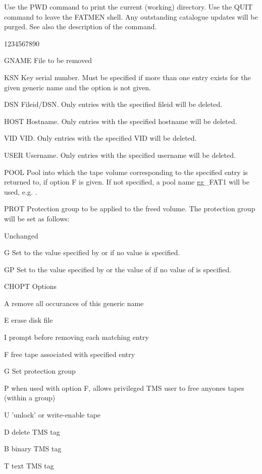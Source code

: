 Use the PWD command to print the current (working) directory.
Use the QUIT command to leave the FATMEN shell. Any outstanding
catalogue updates will be purged. See also the description
of the  command.
\begin{DLtt}{1234567890}
\item[GNAME]File to be removed
\item[KSN]Key serial number. Must be specified if more than one
entry exists for the given generic name and the 
 option is not given. 
\item[DSN]Fileid/DSN. Only entries with the specified fileid will be 
deleted.
\item[HOST]Hostname. Only entries with the specified hostname will be
deleted.
\item[VID]VID. Only entries with the specified VID will be
deleted.  
\item[USER]Username. Only entries with the specified username will be
deleted.
\item[POOL]Pool into which the tape volume corresponding to the
specified entry is returned to, if option F is given.
If not specified, a pool name gg\_FAT1 will be used, e.g. .
\item[PROT]Protection group to be applied to the freed volume.
The protection group will be set as follows:
\begin{DLtt}{12}
\item[ ]Unchanged
\item[G]Set to the value specified by  or 
if no value is specified.
\item[GP]Set to the value specified by  or the value
of  if no value of  is specified.
\end{DLtt}
\item[CHOPT]Options
\begin{DLtt}{12}
\item[A]remove all occurances of this generic name
\item[E]erase disk file
\item[I]prompt before removing each matching entry
\item[F]free tape associated with specified entry
\item[G]Set protection group 
\item[P]when used with option F, allows privileged TMS 
user to free anyones tapes (within a group)
\item[U]'unlock' or write-enable tape
\item[D]delete TMS tag
\item[B]binary TMS tag
\item[T]text TMS tag
\end{DLtt}
\end{DLtt}
